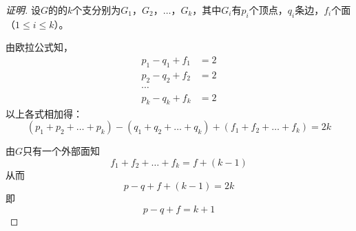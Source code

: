 \begin{proof}[证明]
    设$G$的的$k$个支分别为$G_1$，$G_2$，$\ldots$，$G_k$，其中$G_i$有$p_i$个顶点，$q_i$条边，$f_i$个面（$1\leq i \leq k$）。

  由欧拉公式知，
  \begin{align*}
    p_1-q_1+f_1&=2\\
    p_2-q_2+f_2&=2\\
    \cdots&\\
    p_k-q_k+f_k&=2
  \end{align*}
  以上各式相加得：
  \[(p_1+p_2+\ldots+p_k)-(q_1+q_2+\ldots+q_k)+(f_1+f_2+\ldots+f_k)=2k\]

由$G$只有一个外部面知
\[f_1 + f_2 + \ldots + f_k = f + (k-1)\]
从而
\[p-q+f+(k-1)=2k\]
即
\[p-q+f = k + 1\]

\end{proof}
